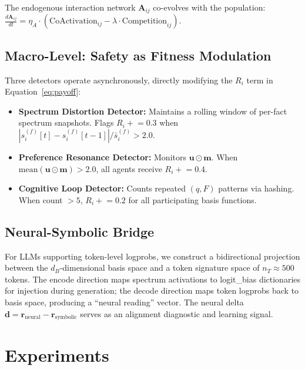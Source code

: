 \documentclass[review]{elsarticle}
\begin{document}
The endogenous interaction network $\mathbf{A}_{ij}$ co-evolves with the
population: $\frac{d\mathbf{A}_{ij}}{dt} = \eta_A \cdot
(\text{CoActivation}_{ij} - \lambda \cdot \text{Competition}_{ij})$.

\subsection{Macro-Level: Safety as Fitness Modulation}
\label{sec:safety}

Three detectors operate asynchronously, directly modifying the $R_i$ term
in Equation~\ref{eq:payoff}:

\begin{itemize}[leftmargin=*,itemsep=0pt]
\item \textbf{Spectrum Distortion Detector:} Maintains a rolling window
  of per-fact spectrum snapshots. Flags $R_i \mathrel{+}= 0.3$ when
  $|s_i^{(f)}[t] - s_i^{(f)}[t-1]| / \bar{s}_i^{(f)} > 2.0$.
\item \textbf{Preference Resonance Detector:} Monitors $\mathbf{u} \odot
  \mathbf{m}$. When $\text{mean}(\mathbf{u} \odot \mathbf{m}) > 2.0$,
  all agents receive $R_i \mathrel{+}= 0.4$.
\item \textbf{Cognitive Loop Detector:} Counts repeated $(q, F)$ patterns
  via hashing. When count $> 5$, $R_i \mathrel{+}= 0.2$ for all
  participating basis functions.
\end{itemize}

\subsection{Neural-Symbolic Bridge}
\label{sec:neural}

For LLMs supporting token-level logprobs, we construct a bidirectional
projection between the $d_B$-dimensional basis space and a token signature
space of $n_T \approx 500$ tokens. The encode direction maps spectrum
activations to logit\_bias dictionaries for injection during generation;
the decode direction maps token logprobs back to basis space, producing a
``neural reading'' vector. The neural delta $\mathbf{d} = \mathbf{r}_{\text{neural}}
- \mathbf{r}_{\text{symbolic}}$ serves as an alignment diagnostic and
learning signal.

\section{Experiments}
\label{sec:experiments}
\end{document}
